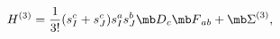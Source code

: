 \begin{equation}
\label{H3FGK}
H^{(3)}=\frac{1}{3!}(s^{c}_{I}+s^{c}_{J})s^{a}_{I}s^{b}_{J}{\mb D}_{c}{\mb F}_{ab}
+{\mb \Sigma}^{(3)},
\end{equation}

